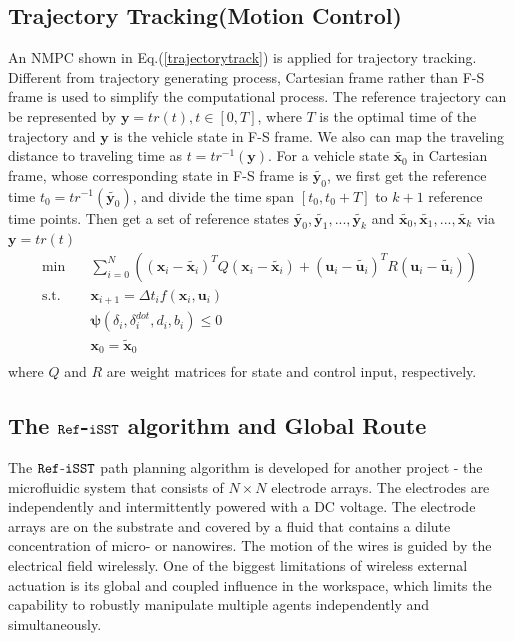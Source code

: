 \documentclass[conference, onecolumn]{IEEEtran}
\begin{document}
\subsection{Trajectory Tracking(Motion Control)}
An NMPC shown in Eq.(\ref{trajectorytrack}) is applied for trajectory tracking. Different from trajectory generating process, Cartesian frame rather than F-S frame is used to simplify the computational process. The reference trajectory can be represented by $\boldsymbol{y}=tr(t),t \in [0,T]$, where $T$ is the optimal time of the trajectory and $\boldsymbol{y}$ is the vehicle state in F-S frame. We also can map the traveling distance to traveling time as $t=tr^{-1}(\boldsymbol{y})$. For a vehicle state $\widetilde{\boldsymbol{x}_0}$ in Cartesian frame, whose corresponding state in F-S frame is $\widetilde{\boldsymbol{y}_0}$, we first get the reference time $t_0=tr^{-1}(\widetilde{\boldsymbol{y}_0})$, and divide the time span $[t_0,t_0+T]$ to $k+1$ reference time points. Then get a set of reference states $\widetilde{\boldsymbol{y}_0},\widetilde{\boldsymbol{y}_1},...,\widetilde{\boldsymbol{y}_k}$ and $\widetilde{\boldsymbol{x}_0},\widetilde{\boldsymbol{x}_1},...,\widetilde{\boldsymbol{x}_k}$ via $\boldsymbol{y}=tr(t)$
\begin{equation}
	\label{trajectorytrack}
	\begin{aligned}
		\min \quad & \sum_{i = 0}^{N}\left((\boldsymbol{x}_i-\widetilde{\boldsymbol{x}_i})^TQ(\boldsymbol{x}_i-\widetilde{\boldsymbol{x}_i}) + (\boldsymbol{u}_i-\widetilde{\boldsymbol{u}_i})^TR(\boldsymbol{u}_i-\widetilde{\boldsymbol{u}_i})\right)\\
		\textrm{s.t.} \quad & \boldsymbol{x}_{i+1}=\varDelta t_i f(\boldsymbol{x}_i,\boldsymbol{u}_i)\\
		\quad &  \boldsymbol{\psi}(\delta_i,\delta^{dot}_i,d_i,b_i)\leqslant 0 \\
		\quad & \boldsymbol{x}_0=\widetilde{\boldsymbol{x}}_0
		\\
	\end{aligned}
\end{equation}
where $Q$ and $R$ are weight matrices for state and control input, respectively.

\subsection{The $\tt Ref$-$\tt iSST$ algorithm and Global Route}
The $\tt Ref$-$\tt iSST$ path planning algorithm is developed for another project - the microfluidic system that consists of $N \times N$ electrode arrays. The electrodes are independently and intermittently powered with a DC voltage. The electrode arrays are on the substrate and covered by a fluid that contains a dilute concentration of micro- or nanowires. The motion of the wires is guided by the electrical field wirelessly. One of the biggest limitations of wireless external actuation is its global and coupled influence in the workspace, which limits the capability to robustly manipulate multiple agents independently and simultaneously.
\end{document}
